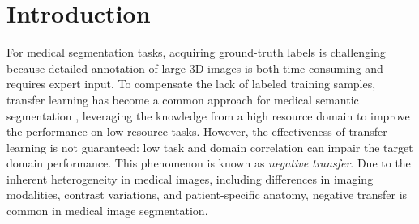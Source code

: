 \section{Introduction}
\label{sec:intro}


For medical segmentation tasks, acquiring ground-truth labels is challenging because  detailed annotation of large 3D images is both time-consuming and requires expert input\cite{medical_deeplearning1, medical_deeplearning2}. To compensate the lack of labeled training samples, transfer learning has become a common approach for medical semantic segmentation \cite{medical_transfer1, medical_transfer2}, 
leveraging the knowledge from a high resource domain to improve the performance on low-resource tasks\cite{pan2009survey}. 
However, the effectiveness of transfer learning is not guaranteed: low task and domain correlation can impair the target domain performance. This phenomenon is known as  {\it negative transfer}\cite{negative_transfer_2}. 
Due to the inherent heterogeneity in medical images, including differences in imaging modalities, contrast variations, and patient-specific anatomy\cite{medical_transfer1, medical_da},   negative transfer  is common in medical image segmentation\cite{negative-transfer}. 

